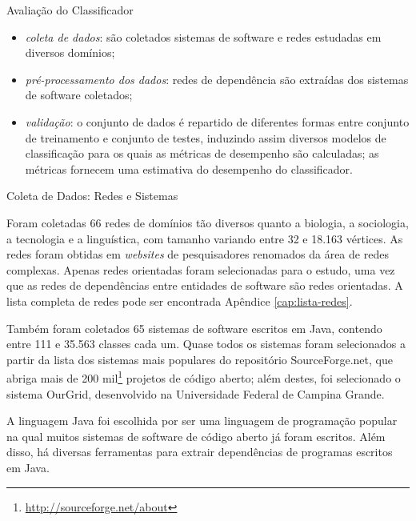 \begin{section}{Avaliação do Classificador}
	\begin{itemize}
		\item \emph{coleta de dados}: são coletados sistemas de software e redes estudadas em diversos domínios;
		\item \emph{pré-processamento dos dados}: redes de dependência são extraídas dos sistemas de software coletados;
		\item \emph{validação}: o conjunto de dados é repartido de diferentes formas entre conjunto de treinamento e conjunto de testes, induzindo assim diversos modelos de classificação para os quais as métricas de desempenho são calculadas; as métricas fornecem uma estimativa do desempenho do classificador.
	\end{itemize}
	
	
\begin{subsection}{Coleta de Dados: Redes e Sistemas}

			Foram coletadas 66 redes de domínios tão diversos quanto a biologia, a sociologia, a tecnologia e a linguística, com tamanho variando entre 32 e 18.163 vértices. As redes foram obtidas em \emph{websites} de pesquisadores renomados da área de redes complexas. Apenas redes orientadas foram selecionadas para o estudo, uma vez que as redes de dependências entre entidades de software são redes orientadas. A lista completa de redes pode ser encontrada Apêndice \ref{cap:lista-redes}.

		  Também foram coletados 65 sistemas de software escritos em Java, contendo entre 111 e 35.563 classes cada um. Quase todos os sistemas foram selecionados a partir da lista dos sistemas mais populares do repositório SourceForge.net, que abriga mais de 200 mil\footnote{\url{http://sourceforge.net/about}} projetos de código aberto; além destes, foi selecionado o sistema OurGrid, desenvolvido na Universidade Federal de Campina Grande. 

			A linguagem Java foi escolhida por ser uma linguagem de programação popular na qual muitos sistemas de software de código aberto já foram escritos. Além disso, há diversas ferramentas para extrair dependências de programas escritos em Java.


\end{subsection}
\end{section}
